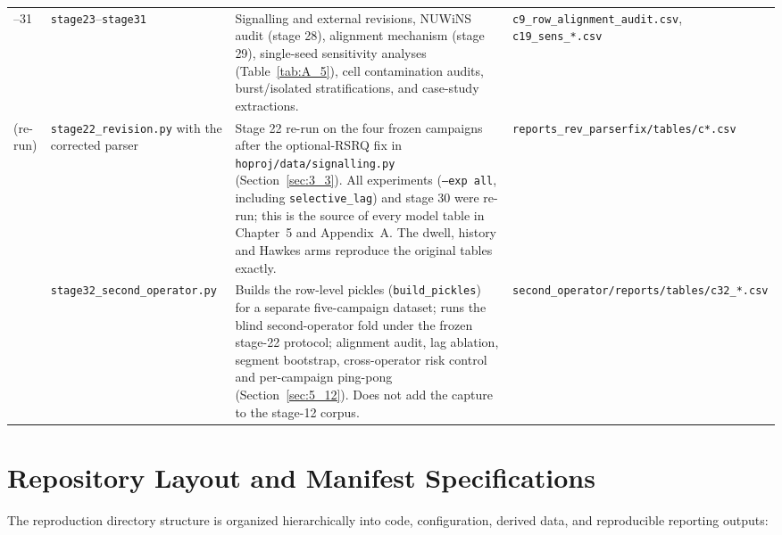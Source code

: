 \begin{table}[htbp]
\begin{tabularx}{\linewidth}{>{\raggedright\arraybackslash}p{1.1cm} >{\raggedright\arraybackslash}p{3.6cm} >{\raggedright\arraybackslash}X >{\raggedright\arraybackslash}p{3.2cm}}
23--31 & \texttt{stage23}--\texttt{stage31} & Signalling and external revisions, NUWiNS audit (stage 28), alignment mechanism (stage 29), single-seed sensitivity analyses (Table~\ref{tab:A_5}), cell contamination audits, burst/isolated stratifications, and case-study extractions. & \texttt{c9\_row\_alignment\_audit.csv}, \texttt{c19\_sens\_*.csv} \\
22 (re-run) & \texttt{stage22\_revision.py} with the corrected parser & Stage 22 re-run on the four frozen campaigns after the optional-RSRQ fix in \texttt{hoproj/data/signalling.py} (Section~\ref{sec:3_3}). All experiments (\texttt{--exp all}, including \texttt{selective\_lag}) and stage 30 were re-run; this is the source of every model table in Chapter~5 and Appendix~A. The dwell, history and Hawkes arms reproduce the original tables exactly. & \texttt{reports\_rev\_parserfix/tables/c*.csv} \\
32 & \texttt{stage32\_second\_operator.py} & Builds the row-level pickles (\texttt{build\_pickles}) for a separate five-campaign dataset; runs the blind second-operator fold under the frozen stage-22 protocol; alignment audit, lag ablation, segment bootstrap, cross-operator risk control and per-campaign ping-pong (Section~\ref{sec:5_12}). Does not add the capture to the stage-12 corpus. & \texttt{second\_operator/reports/tables/c32\_*.csv} \\
\bottomrule
\end{tabularx}
\end{table}

\section{Repository Layout and Manifest Specifications}
\label{sec:C_2}

The reproduction directory structure is organized hierarchically into code, configuration, derived data, and reproducible reporting outputs:


